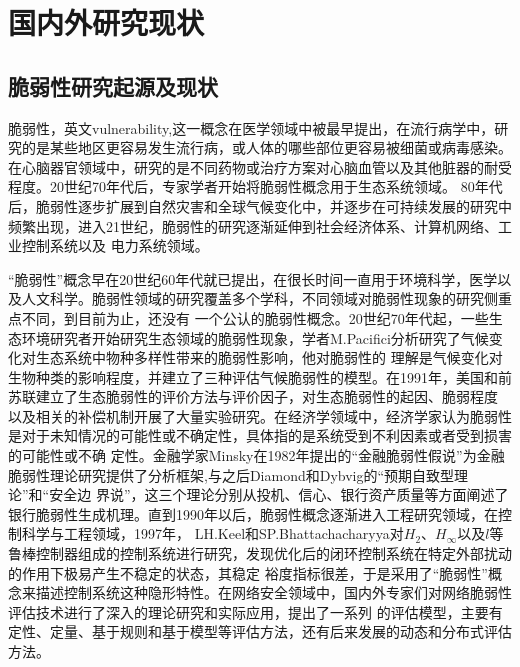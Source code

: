 \section{国内外研究现状}
\label{sec:research_presentSituation}

\subsection{脆弱性研究起源及现状}
\label{sec:origin}
脆弱性，英文vulnerability,这一概念在医学领域中被最早提出，在流行病学\cite{refs2,refs3}中，研究的是某些地区更容易发生流行病，或人体的哪些部位更容易被细菌或病毒感染。
在心脑器官领域中，研究的是不同药物或治疗方案对心脑血管以及其他脏器的耐受程度\cite{refs4,refs5}。20世纪70年代后，专家学者开始将脆弱性概念用于生态系统领域\cite{refs6,refs7}。
80年代后，脆弱性逐步扩展到自然灾害和全球气候变化中，并逐步在可持续发展的研究中频繁出现，进入21世纪，脆弱性的研究逐渐延伸到社会经济体系、计算机网络、工业控制系统以及
电力系统领域。

“脆弱性”概念早在20世纪60年代就已提出，在很长时间一直用于环境科学，医学以及人文科学。脆弱性领域的研究覆盖多个学科，不同领域对脆弱性现象的研究侧重点不同，到目前为止，还没有
一个公认的脆弱性概念。20世纪70年代起，一些生态环境研究者开始研究生态领域的脆弱性现象，学者M.Pacifici分析研究了气候变化对生态系统中物种多样性带来的脆弱性影响，他对脆弱性的
理解是气候变化对生物种类的影响程度，并建立了三种评估气候脆弱性的模型\cite{refs8}。在1991年，美国和前苏联建立了生态脆弱性的评价方法与评价因子，对生态脆弱性的起因、脆弱程度
以及相关的补偿机制开展了大量实验研究\cite{refs9}。在经济学领域中，经济学家认为脆弱性是对于未知情况的可能性或不确定性，具体指的是系统受到不利因素或者受到损害的可能性或不确
定性\cite{refs10,refs11}。金融学家Minsky在1982年提出的“金融脆弱性假说”为金融脆弱性理论研究提供了分析框架\cite{refs12},与之后Diamond和Dybvig的“预期自致型理论”和“安全边
界说”\cite{refs13}，这三个理论分别从投机、信心、银行资产质量等方面阐述了银行脆弱性生成机理。直到1990年以后，脆弱性概念逐渐进入工程研究领域，在控制科学与工程领域，1997年，
LH.Keel和SP.Bhattachacharyya对$H_{2}$、$H_{\infty}$以及$l$等鲁棒控制器组成的控制系统进行研究，发现优化后的闭环控制系统在特定外部扰动的作用下极易产生不稳定的状态，其稳定
裕度指标很差，于是采用了“脆弱性”概念来描述控制系统这种隐形特性\cite{refs14}。在网络安全领域中，国内外专家们对网络脆弱性评估技术进行了深入的理论研究和实际应用，提出了一系列
的评估模型，主要有定性、定量、基于规则和基于模型等评估方法，还有后来发展的动态和分布式评估方法\cite{refs15,refs16}。

